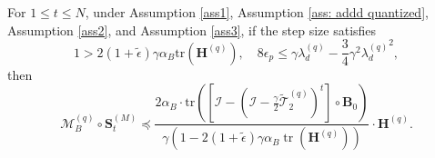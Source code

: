 \documentclass[11pt, letterpaper]{article}
\begin{document}
\begin{lemma}
    \label{lem: f7}
    For $1 \leq t\leq N$, under Assumption \ref{ass1}, Assumption \ref{ass: addd quantized}, Assumption \ref{ass2}, and Assumption \ref{ass3}, if the step size satisfies
    \begin{equation*}
        1>2(1+\tilde{\epsilon})\gamma\alpha_B\mathrm{tr}(\mathbf{H}^{(q)}),\quad 8\epsilon_p\leq \gamma \lambda_d^{(q)}-\frac{3}{4}\gamma^2{\lambda_d^{(q)}}^2,
    \end{equation*}
    then
    \begin{equation*}
         \mathcal{M}_B^{(q)} \circ \mathbf{S}_t^{(M)} \preceq          \frac{2\alpha_B\cdot\mathrm{tr}\left(\left[\mathcal{I}-(\mathcal{I}-\frac{\gamma}{2}\widetilde{\mathcal{T}}_2^{(q)})^t\right]\circ\mathbf{B}_0\right)}{\gamma(1-2(1+\tilde{\epsilon})\gamma\alpha_B\operatorname{tr}(\mathbf{H}^{(q)}))}\cdot\mathbf{H}^{(q)}.
    \end{equation*}
\end{lemma}
\end{document}
